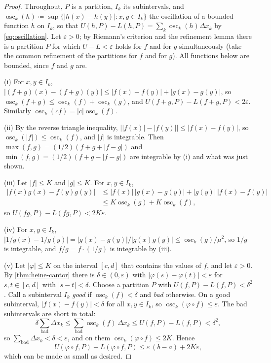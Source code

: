 \begin{proof}
Throughout, $P$ is a partition, $I_k$ its subintervals, and $\operatorname{osc}_k(h)\coloneqq\sup\{|h(x)-h(y)|: x,y\in I_k\}$ the oscillation of a bounded function $h$ on $I_k$, so that $U(h,P)-L(h,P)=\sum_k\operatorname{osc}_k(h)\Delta x_k$ by \eqref{eq:oscillation}. Let $\varepsilon>0$; by Riemann's criterion and the refinement lemma there is a partition $P$ for which $U-L<\varepsilon$ holds for $f$ and for $g$ simultaneously (take the common refinement of the partitions for $f$ and for $g$). All functions below are bounded, since $f$ and $g$ are.

(i) For $x,y\in I_k$, $|(f+g)(x)-(f+g)(y)|\le|f(x)-f(y)|+|g(x)-g(y)|$, so $\operatorname{osc}_k(f+g)\le\operatorname{osc}_k(f)+\operatorname{osc}_k(g)$, and $U(f+g,P)-L(f+g,P)<2\varepsilon$. Similarly $\operatorname{osc}_k(cf)=|c|\operatorname{osc}_k(f)$.

(ii) By the reverse triangle inequality, $\bigl||f(x)|-|f(y)|\bigr|\le|f(x)-f(y)|$, so $\operatorname{osc}_k(|f|)\le\operatorname{osc}_k(f)$, and $|f|$ is integrable. Then $\max(f,g)=(1/2)(f+g+|f-g|)$ and $\min(f,g)=(1/2)(f+g-|f-g|)$ are integrable by (i) and what was just shown.

(iii) Let $|f|\le K$ and $|g|\le K$. For $x,y\in I_k$,
\begin{align*}
|f(x)g(x)-f(y)g(y)|&\le|f(x)|\,|g(x)-g(y)|+|g(y)|\,|f(x)-f(y)|\\
&\le K\operatorname{osc}_k(g)+K\operatorname{osc}_k(f),
\end{align*}
so $U(fg,P)-L(fg,P)<2K\varepsilon$.

(iv) For $x,y\in I_k$, $|1/g(x)-1/g(y)|=|g(x)-g(y)|/|g(x)g(y)|\le\operatorname{osc}_k(g)/\mu^2$, so $1/g$ is integrable, and $f/g=f\cdot(1/g)$ is integrable by (iii).

(v) Let $|\varphi|\le K$ on the interval $[c,d]$ that contains the values of $f$, and let $\varepsilon>0$. By \cref{thm:heine-cantor} there is $\delta\in(0,\varepsilon)$ with $|\varphi(s)-\varphi(t)|<\varepsilon$ for $s,t\in[c,d]$ with $|s-t|<\delta$. Choose a partition $P$ with $U(f,P)-L(f,P)<\delta^2$. Call a subinterval $I_k$ \emph{good} if $\operatorname{osc}_k(f)<\delta$ and \emph{bad} otherwise. On a good subinterval, $|f(x)-f(y)|<\delta$ for all $x,y\in I_k$, so $\operatorname{osc}_k(\varphi\circ f)\le\varepsilon$. The bad subintervals are short in total:
\[
\delta\sum_{\text{bad}}\Delta x_k\le\sum_{\text{bad}}\operatorname{osc}_k(f)\,\Delta x_k\le U(f,P)-L(f,P)<\delta^2 ,
\]
so $\sum_{\text{bad}}\Delta x_k<\delta<\varepsilon$, and on them $\operatorname{osc}_k(\varphi\circ f)\le2K$. Hence
\[
U(\varphi\circ f,P)-L(\varphi\circ f,P)\le\varepsilon\,(b-a)+2K\varepsilon ,
\]
which can be made as small as desired.
\end{proof}

